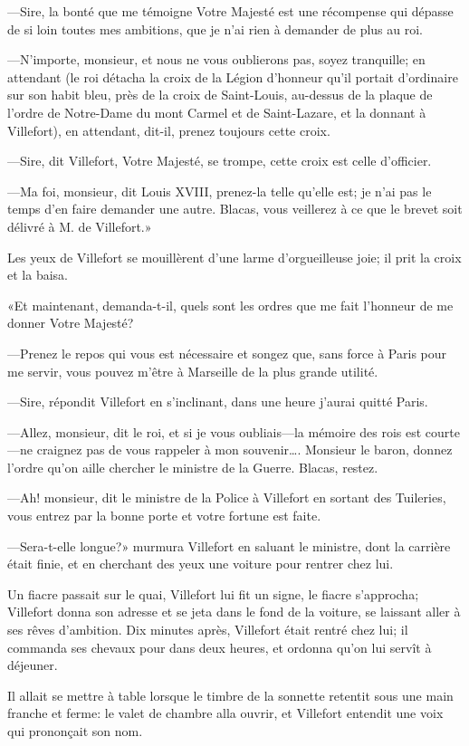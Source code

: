 —Sire, la bonté que me témoigne Votre Majesté est une récompense qui dépasse de si loin toutes mes ambitions, que je n'ai rien à demander de plus au roi.

—N'importe, monsieur, et nous ne vous oublierons pas, soyez tranquille; en attendant (le roi détacha la croix de la Légion d'honneur qu'il portait d'ordinaire sur son habit bleu, près de la croix de Saint-Louis, au-dessus de la plaque de l'ordre de Notre-Dame du mont Carmel et de Saint-Lazare, et la donnant à Villefort), en attendant, dit-il, prenez toujours cette croix.

—Sire, dit Villefort, Votre Majesté, se trompe, cette croix est celle d'officier.

—Ma foi, monsieur, dit Louis XVIII, prenez-la telle qu'elle est; je n'ai pas le temps d'en faire demander une autre. Blacas, vous veillerez à ce que le brevet soit délivré à M. de Villefort.»

Les yeux de Villefort se mouillèrent d'une larme d'orgueilleuse joie; il prit la croix et la baisa.

«Et maintenant, demanda-t-il, quels sont les ordres que me fait l'honneur de me donner Votre Majesté?

—Prenez le repos qui vous est nécessaire et songez que, sans force à Paris pour me servir, vous pouvez m'être à Marseille de la plus grande utilité.

—Sire, répondit Villefort en s'inclinant, dans une heure j'aurai quitté Paris.

—Allez, monsieur, dit le roi, et si je vous oubliais—la mémoire des rois est courte—ne craignez pas de vous rappeler à mon souvenir\dots. Monsieur le baron, donnez l'ordre qu'on aille chercher le ministre de la Guerre. Blacas, restez.

—Ah! monsieur, dit le ministre de la Police à Villefort en sortant des Tuileries, vous entrez par la bonne porte et votre fortune est faite.

—Sera-t-elle longue?» murmura Villefort en saluant le ministre, dont la carrière était finie, et en cherchant des yeux une voiture pour rentrer chez lui.

Un fiacre passait sur le quai, Villefort lui fit un signe, le fiacre s'approcha; Villefort donna son adresse et se jeta dans le fond de la voiture, se laissant aller à ses rêves d'ambition. Dix minutes après, Villefort était rentré chez lui; il commanda ses chevaux pour dans deux heures, et ordonna qu'on lui servît à déjeuner.

Il allait se mettre à table lorsque le timbre de la sonnette retentit sous une main franche et ferme: le valet de chambre alla ouvrir, et Villefort entendit une voix qui prononçait son nom.

